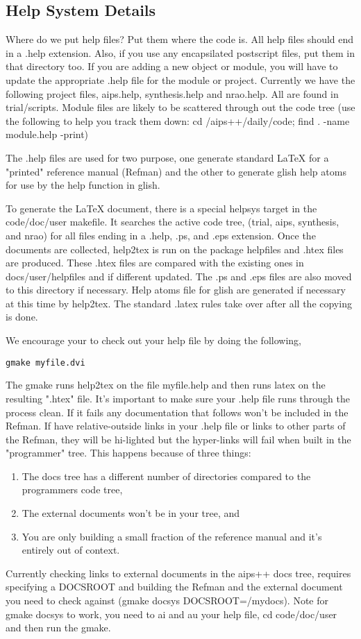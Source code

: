 \subsection{Help System Details}
Where do we put help files?  Put them where the code is.  All help files should
end in a .help extension.  Also, if you use any encapsilated postscript files,
put them in that directory too.  If you are adding a new object or module, you
will have to update
the appropriate .help file for the module or project.  Currently we have the
following project files, aips.help, synthesis.help and nrao.help.  All are
found in
trial/scripts.  Module files are likely to be scattered through out the code
tree (use the following to help you track them down: cd /aips++/daily/code;
find . -name module.help -print)

The .help files are used for two purpose, one generate standard LaTeX for a 
"printed" reference manual (Refman) and the other to generate glish help atoms
for use by the help function in glish.

To generate the LaTeX document, there is a special helpsys target in the 
code/doc/user makefile.  It searches the active code tree, (trial, aips, 
synthesis, and nrao) for all files ending in a .help, .ps, and .eps extension.
Once the documents are collected, help2tex is run on the package helpfiles
and .htex files are produced.  These .htex files are compared with the existing
ones in docs/user/helpfiles and if different updated.  The .ps and .eps files
are also moved to this directory if necessary.  Help atoms file for glish are
generated if necessary at this time by help2tex.  The standard .latex rules
take over after all the copying is done.

We encourage your to check out your help file by doing the following,

\begin{verbatim}
gmake myfile.dvi
\end{verbatim}

The gmake runs help2tex on the file myfile.help 
and then runs latex on the resulting ".htex" file.
It's important to make sure your .help file runs through the process clean. If
it fails any documentation that follows won't be included in the Refman.  If
have relative-outside links in your .help file or links to other parts of the
Refman,
they will be hi-lighted but the hyper-links will fail when built in the 
"programmer" tree.  This happens because of three things:
\begin{enumerate}
\item The docs tree has a different number of directories compared to the
programmers code tree,
\item The external documents won't be in your tree, and
\item You are only building a small fraction of the reference manual and it's
entirely out of context.
\end{enumerate}
Currently checking links to external documents in the aips++ docs tree,
requires
specifying a DOCSROOT and building the Refman and the external document you 
need to check against (gmake docsys DOCSROOT=/mydocs).  Note for gmake docsys
to work, you need to ai and au your help file, cd code/doc/user and then run
the gmake.
